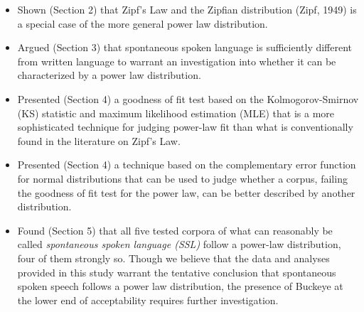 \documentclass[12pt]{article}
\begin{document}
\begin{itemize}
\item Shown (Section 2) that Zipf's Law and the Zipfian distribution (Zipf, 1949) is a special case of the more general power law distribution.
\item Argued (Section 3) that spontaneous spoken language is sufficiently different from written language to warrant an investigation into whether it can be characterized by a power law distribution. 
\item Presented (Section 4) a goodness of fit test based on the Kolmogorov-Smirnov (KS) statistic and maximum likelihood estimation (MLE) that is a more sophisticated technique for judging power-law fit than what is conventionally found in the literature on Zipf's Law.
\item Presented (Section 4) a technique based on the complementary error function for normal distributions that can be used to judge whether a corpus, failing the goodness of fit test for the power law, can be better described by another distribution.
\item Found (Section 5) that all five tested corpora of what can reasonably be called \emph{spontaneous spoken language (SSL)} follow a power-law distribution, four of them strongly so.  Though we believe that the data and analyses provided in this study warrant the tentative conclusion that spontaneous spoken speech follows a power law distribution, the presence of Buckeye at the lower end of acceptability requires further investigation. 
\end{itemize}
\end{document}
